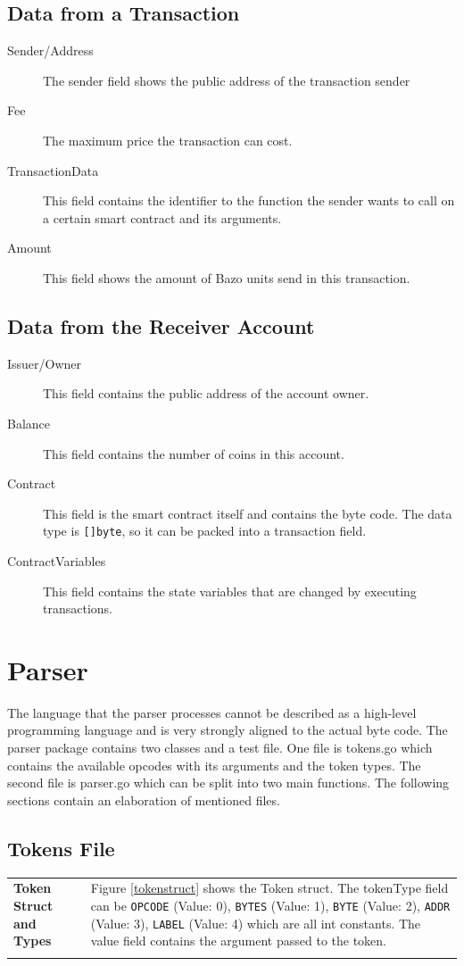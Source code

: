 \subsection{Data from a Transaction}
\begin{description}
  \item[Sender/Address] The sender field shows the public address of the transaction sender 
  \item[Fee] The maximum price the transaction can cost.
  \item[TransactionData] This field contains the identifier to the function the sender wants to call on a certain smart contract and its arguments.
  \item[Amount] This field shows the amount of Bazo units send in this transaction.
\end{description}

\subsection{Data from the Receiver Account}
\begin{description}
  \item[Issuer/Owner] This field contains the public address of the account owner.
  \item[Balance] This field contains the number of coins in this account.
  \item[Contract] This field is the smart contract itself and contains the byte code. The data type is \texttt{[]byte}, so it can be packed into a transaction field.
  \item[ContractVariables] This field contains the state variables that are changed by executing transactions.
\end{description}

\section{Parser}
The language that the parser processes cannot be described as a high-level programming language and is very strongly aligned to the actual byte code. The parser package contains two classes and a test file. One file is tokens.go which contains the available opcodes with its arguments and the token types. The second file is parser.go which can be split into two main functions. The following sections contain an elaboration of mentioned files.

\subsection{Tokens File}
\begin{tabular}[t]{ p{3cm} p{12.5cm}}
\raggedright
\textbf{Token Struct and Types} &
Figure \ref{tokenstruct} shows the Token struct. The tokenType field can be \texttt{OPCODE} (Value: 0), \texttt{BYTES} (Value: 1), \texttt{BYTE} (Value: 2), \texttt{ADDR} (Value: 3), \texttt{LABEL} (Value: 4) which are all int constants. The value field contains the argument passed to the token. \\ \\
\end{tabular}

